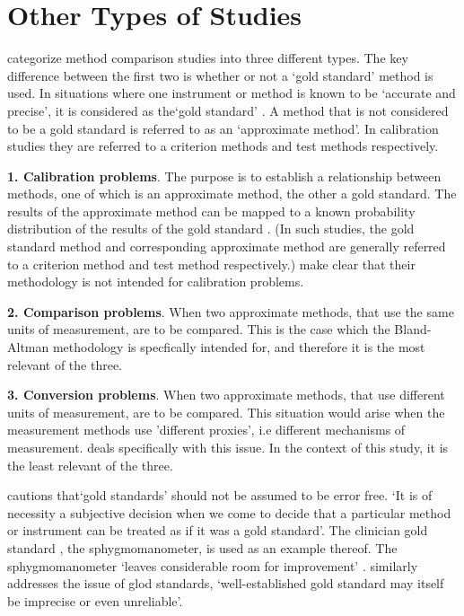 \documentclass[12pt, a4paper]{report}
\theoremstyle{plain}
\theoremstyle{definition}
\theoremstyle{remark}
\begin{document}
	\section{Other Types of Studies}
	\citet{lewis} categorize method comparison studies into three
	different types.  The key difference between the first two is
	whether or not a `gold standard' method is used. In situations
	where one instrument or method is known to be `accurate and
	precise', it is considered as the`gold standard' \citep{lewis}. A
	method that is not considered to be a gold standard is referred to
	as an `approximate method'. In calibration studies they are
	referred to a criterion methods and test methods respectively.
	
	
	\textbf{1. Calibration problems}. The purpose is to establish a
	relationship between methods, one of which is an approximate
	method, the other a gold standard. The results of the approximate
	method can be mapped to a known probability distribution of the
	results of the gold standard \citep{lewis}. (In such studies, the
	gold standard method and corresponding approximate method are
	generally referred to a criterion method and test method
	respectively.) \citet*{BA83} make clear that their methodology is
	not intended for calibration problems.
	
	\bigskip \textbf{2. Comparison problems}. When two approximate
	methods, that use the same units of measurement, are to be
	compared. This is the case which the Bland-Altman methodology is
	specfically intended for, and therefore it is the most relevant of
	the three.
	
	\bigskip \textbf{3. Conversion problems}. When two approximate
	methods, that use different units of measurement, are to be
	compared. This situation would arise when the measurement methods
	use 'different proxies', i.e different mechanisms of measurement.
	\citet{lewis} deals specifically with this issue. In the context
	of this study, it is the least relevant of the three.
	
	\citet[p.47]{DunnSEME} cautions that`gold standards' should not be
	assumed to be error free. `It is of necessity a subjective
	decision when we come to decide that a particular method or
	instrument can be treated as if it was a gold standard'. The
	clinician gold standard , the sphygmomanometer, is used as an
	example thereof.  The sphygmomanometer `leaves considerable room
	for improvement' \citep{DunnSEME}. \citet{pizzi} similarly
	addresses the issue of glod standards, `well-established gold
	standard may itself be imprecise or even unreliable'.
	
\end{document}

